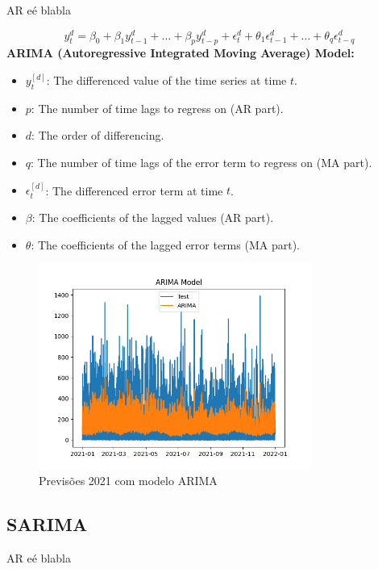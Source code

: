 AR eé blabla

\begin{equation} \label{eq:ARIMA}y_t^d = \beta_0 + \beta_1 y_{t-1}^d + \dots + \beta_p y_{t-p}^d + \epsilon_t^d + \theta_1 \epsilon_{t-1}^d + \dots + \theta_q \epsilon_{t-q}^d \end{equation}
\textbf{ARIMA (Autoregressive Integrated Moving Average) Model:}
\begin{itemize}
  \item $y_t^{[d]}$: The differenced value of the time series at time $t$.
  \item $p$: The number of time lags to regress on (AR part).
  \item $d$: The order of differencing.
  \item $q$: The number of time lags of the error term to regress on (MA part).
  \item $\epsilon_t^{[d]}$: The differenced error term at time $t$.
  \item $\beta$: The coefficients of the lagged values (AR part).
  \item $\theta$: The coefficients of the lagged error terms (MA part).
\end{itemize}

\begin{figure}[H]
    \centering
    \includegraphics[width=0.8\textwidth]{../plots/ARIMA_model.png}
    \caption{Previsões 2021 com modelo ARIMA}
    \label{fig:ARIMA_model}
\end{figure}

\subsection{SARIMA}

AR eé blabla



